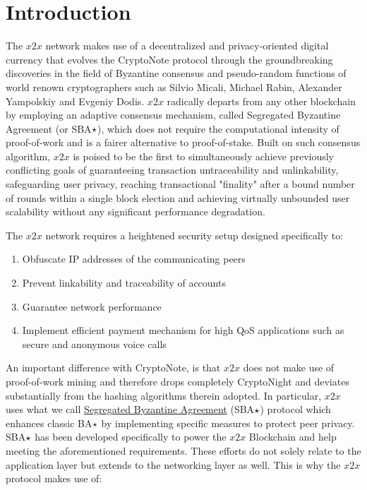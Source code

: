 \section{Introduction}
The $x2x$ network makes use of a decentralized and privacy-oriented digital currency that evolves the CryptoNote protocol\cite{CryptoNote} through the groundbreaking discoveries in the field of Byzantine consensus and pseudo-random functions of world renown cryptographers such as Silvio Micali, Michael Rabin, Alexander Yampolskiy and Evgeniy Dodis. $x2x$ radically departs from any other blockchain by employing an adaptive consensus mechanism, called Segregated Byzantine Agreement (or SBA{$\large\star$}), which does not require the computational intensity of proof-of-work and is a fairer alternative to proof-of-stake. Built on such consensus algorithm, $x2x$ is poised to be the first to simultaneously achieve previously conflicting goals of guaranteeing transaction untraceability and unlinkability, safeguarding user privacy, reaching transactional "finality" after a bound number of rounds within a single block election and achieving virtually unbounded user scalability without any significant performance degradation.

The $x2x$ network requires a heightened security setup designed specifically to:

\begin{enumerate}
\item Obfuscate IP addresses of the communicating peers
\item Prevent linkability and traceability of accounts
\item Guarantee network performance
\item Implement efficient payment mechanism for high QoS applications such as secure and anonymous voice calls
\end{enumerate}

An important difference with CryptoNote, is that $x2x$ does not make use of proof-of-work mining and therefore drops completely CryptoNight and deviates substantially from the hashing algorithms therein adopted. In particular, $x2x$ uses what we call \hyperref[sec:SBA]{Segregated Byzantine Agreement} (SBA$\large\star$) protocol which enhances classic BA$\large\star$ by implementing specific measures to protect peer privacy. SBA$\large\star$ has been developed specifically to power the $x2x$ Blockchain and help meeting the aforementioned requirements. These efforts do not solely relate to the application layer but extends to the networking layer as well. This is why the $x2x$ protocol makes use of:

